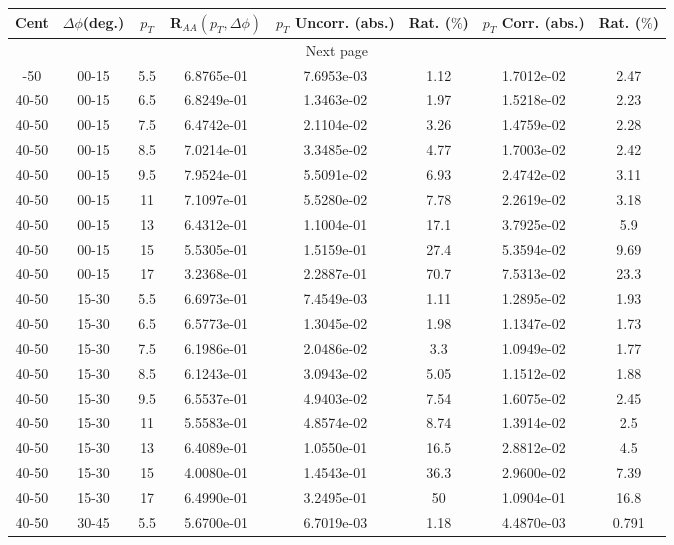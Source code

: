             
\begin{longtable}{|cccccccc|}
\hline
Cent & $\Delta\phi$(deg.) & $p_{T}$ & R$_{AA}(p_{T},\Delta\phi)$ & $p_{T}$ Uncorr. (abs.) & Rat. ($\%$) & $p_{T}$ Corr. (abs.) & Rat. ($\%$)  \\
\hline
\endhead
\hline \multicolumn{8}{|c|}{{Next page}} \\
\hline
\endfoot
\endlastfoot
\hline
40-50 & 00-15 & 5.5 & 6.8765e-01 & 7.6953e-03 & 1.12 & 1.7012e-02 & 2.47 \\ 
40-50 & 00-15 & 6.5 & 6.8249e-01 & 1.3463e-02 & 1.97 & 1.5218e-02 & 2.23 \\ 
40-50 & 00-15 & 7.5 & 6.4742e-01 & 2.1104e-02 & 3.26 & 1.4759e-02 & 2.28 \\ 
40-50 & 00-15 & 8.5 & 7.0214e-01 & 3.3485e-02 & 4.77 & 1.7003e-02 & 2.42 \\ 
40-50 & 00-15 & 9.5 & 7.9524e-01 & 5.5091e-02 & 6.93 & 2.4742e-02 & 3.11 \\ 
40-50 & 00-15 & 11 & 7.1097e-01 & 5.5280e-02 & 7.78 & 2.2619e-02 & 3.18 \\ 
40-50 & 00-15 & 13 & 6.4312e-01 & 1.1004e-01 & 17.1 & 3.7925e-02 & 5.9 \\ 
40-50 & 00-15 & 15 & 5.5305e-01 & 1.5159e-01 & 27.4 & 5.3594e-02 & 9.69 \\ 
40-50 & 00-15 & 17 & 3.2368e-01 & 2.2887e-01 & 70.7 & 7.5313e-02 & 23.3 \\ 
\hline
40-50 & 15-30 & 5.5 & 6.6973e-01 & 7.4549e-03 & 1.11 & 1.2895e-02 & 1.93 \\ 
40-50 & 15-30 & 6.5 & 6.5773e-01 & 1.3045e-02 & 1.98 & 1.1347e-02 & 1.73 \\ 
40-50 & 15-30 & 7.5 & 6.1986e-01 & 2.0486e-02 & 3.3 & 1.0949e-02 & 1.77 \\ 
40-50 & 15-30 & 8.5 & 6.1243e-01 & 3.0943e-02 & 5.05 & 1.1512e-02 & 1.88 \\ 
40-50 & 15-30 & 9.5 & 6.5537e-01 & 4.9403e-02 & 7.54 & 1.6075e-02 & 2.45 \\ 
40-50 & 15-30 & 11 & 5.5583e-01 & 4.8574e-02 & 8.74 & 1.3914e-02 & 2.5 \\ 
40-50 & 15-30 & 13 & 6.4089e-01 & 1.0550e-01 & 16.5 & 2.8812e-02 & 4.5 \\ 
40-50 & 15-30 & 15 & 4.0080e-01 & 1.4543e-01 & 36.3 & 2.9600e-02 & 7.39 \\ 
40-50 & 15-30 & 17 & 6.4990e-01 & 3.2495e-01 & 50 & 1.0904e-01 & 16.8 \\ 
\hline
40-50 & 30-45 & 5.5 & 5.6700e-01 & 6.7019e-03 & 1.18 & 4.4870e-03 & 0.791 \\ 

\end{longtable}
